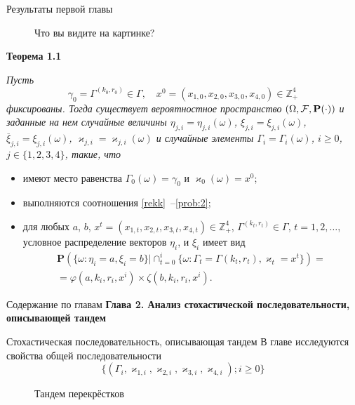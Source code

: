 \documentclass[10pt]{beamer}
\begin{document}
\begin{frame}[allowframebreaks]{Результаты первой главы}

  \begin{figure}[h]
    \centering
    \caption{Что вы видите на картинке?}
    \label{VK:fig:2}
  \end{figure}
  
\framebreak
    {\bf Теорема 1.1} {\it 
    Пусть 
    $$\gamma_0=\Gamma^{(k_0,r_0)} \in \Gamma, \quad x^0=(x_{1,0},x_{2,0}, x_{3,0},x_{4,0})\in \mathbb{Z}_+^4$$ фиксированы. Тогда существует вероятностное пространство $(\Omega, {\cal F}, {\mathbf P}(\cdot))$ и заданные на нем случайные величины $\eta_{j,i}=\eta_{j,i}(\omega)$, $\xi_{j,i}=\xi_{j,i}(\omega)$, $\overline{\xi}_{j,i}=\xi_{j,i}(\omega)$, $\varkappa_{j,i}=\varkappa_{j,i}(\omega)$ и случайные элементы $\Gamma_i=\Gamma_i(\omega)$, $i\geqslant 0$, $j\in \{1, 2, 3, 4\}$, такие, что 
    \begin{itemize}
    \item имеют место равенства $\Gamma_0(\omega) = \gamma_0$ и $\varkappa_0(\omega)=x^0$;
    \item выполняются соотношения \eqref{rekk}~--\eqref{prob:2};
    \item для любых  $a$, $b$, $x^t=(x_{1,t},x_{2,t},x_{3,t},x_{4,t}) \in \mathbb{Z}_+^4$, $\Gamma^{(k_t,r_t)} \in \Gamma$, $t = 1, 2, \ldots$, условное распределение векторов $\eta_i$, и $\xi_i$ имеет вид 
\begin{multline*}
    {\mathbf P}(\{ \omega \colon \eta_i = a, \xi_i=b\} |\cap_{t=0}^{i}\{\omega\colon \Gamma_t=\Gamma{(k_t,r_t)}, \varkappa_t=x^t\})=\\
=\varphi(a,k_i,r_i,x^i)\times \zeta(b,k_i,r_i,x^i).
\end{multline*}
    \end{itemize}
}


\end{frame}



  \begin{frame}{Содержание по главам}
  \Large{\textbf{Глава 2. Анализ стохастической последовательности, описывающей тандем}}\par


      \end{frame}

\begin{frame}{Стохастическая последовательность, описывающая тандем}
В главе исследуются свойства общей последовательности
\begin{equation}
    \{(\Gamma_i, \varkappa_{1,i},\varkappa_{2,i}, \varkappa_{3,i}, \varkappa_{4,i}); i \geqslant 0\}
\end{equation}
        \begin{figure}[h]
    \centering
    \caption{Тандем перекрёстков}
    \label{VK:fig:1}
  \end{figure}
\end{frame}
\end{document}
